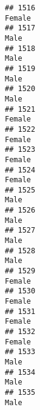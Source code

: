 \documentclass[]{article}
\begin{document}
\begin{verbatim}
## 1516                                                                                                                          Female
## 1517                                                                                                                            Male
## 1518                                                                                                                            Male
## 1519                                                                                                                            Male
## 1520                                                                                                                            Male
## 1521                                                                                                                          Female
## 1522                                                                                                                          Female
## 1523                                                                                                                          Female
## 1524                                                                                                                          Female
## 1525                                                                                                                            Male
## 1526                                                                                                                            Male
## 1527                                                                                                                            Male
## 1528                                                                                                                            Male
## 1529                                                                                                                          Female
## 1530                                                                                                                          Female
## 1531                                                                                                                          Female
## 1532                                                                                                                          Female
## 1533                                                                                                                            Male
## 1534                                                                                                                            Male
## 1535                                                                                                                            Male

\end{verbatim}
\end{document}
